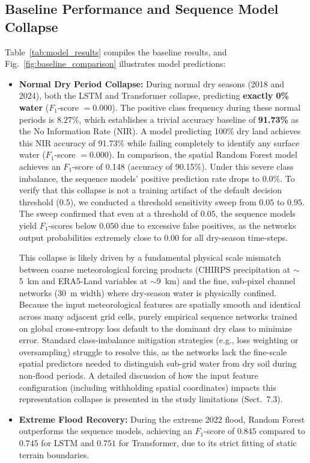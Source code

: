 \documentclass[12pt, a4paper]{article}
\begin{document}
\subsection{Baseline Performance and Sequence Model Collapse}
Table~\ref{tab:model_results} compiles the baseline results, and Fig.~\ref{fig:baseline_comparison} illustrates model predictions:
\begin{itemize}
    \item \textbf{Normal Dry Period Collapse:} During normal dry seasons (2018 and 2024), both the LSTM and Transformer collapse, predicting \textbf{exactly 0\% water} ($F_1$-score $= 0.000$). The positive class frequency during these normal periods is $8.27\%$, which establishes a trivial accuracy baseline of \textbf{91.73\%} as the No Information Rate (NIR). A model predicting 100\% dry land achieves this NIR accuracy of 91.73\% while failing completely to identify any surface water ($F_1$-score $= 0.000$). In comparison, the spatial Random Forest model achieves an $F_1$-score of 0.148 (accuracy of 90.15\%). Under this severe class imbalance, the sequence models' positive prediction rate drops to $0.0\%$. To verify that this collapse is not a training artifact of the default decision threshold ($0.5$), we conducted a threshold sensitivity sweep from $0.05$ to $0.95$. The sweep confirmed that even at a threshold of $0.05$, the sequence models yield $F_1$-scores below $0.050$ due to excessive false positives, as the networks output probabilities extremely close to $0.00$ for all dry-season time-steps.

    This collapse is likely driven by a fundamental physical scale mismatch between coarse meteorological forcing products (CHIRPS precipitation at $\sim$5~km and ERA5-Land variables at $\sim$9~km) and the fine, sub-pixel channel networks (30~m width) where dry-season water is physically confined. Because the input meteorological features are spatially smooth and identical across many adjacent grid cells, purely empirical sequence networks trained on global cross-entropy loss default to the dominant dry class to minimize error. Standard class-imbalance mitigation strategies (e.g., loss weighting or oversampling) struggle to resolve this, as the networks lack the fine-scale spatial predictors needed to distinguish sub-grid water from dry soil during non-flood periods. A detailed discussion of how the input feature configuration (including withholding spatial coordinates) impacts this representation collapse is presented in the study limitations (Sect.~7.3).
    \item \textbf{Extreme Flood Recovery:} During the extreme 2022 flood, Random Forest outperforms the sequence models, achieving an $F_1$-score of $0.845$ compared to $0.745$ for LSTM and $0.751$ for Transformer, due to its strict fitting of static terrain boundaries.
\end{itemize}
\end{document}

